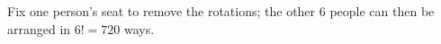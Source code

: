 Fix one person's seat to remove the rotations; the other $6$ people can then be arranged in $6!=\boxed{720}$ ways.
